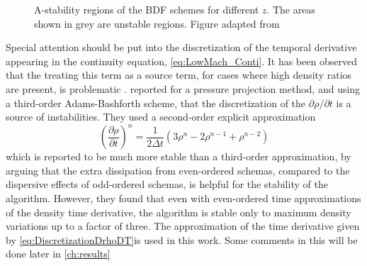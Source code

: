 \begin{figure}
	\centering
	\pgfplotsset{width=0.5\textwidth}
	
	\caption[{A-stability regions of the BDF schemes for different $z$. The areas shown in grey are unstable regions.} ]{A-stability regions of the BDF schemes for different $z$. The areas shown in grey are unstable regions. Figure adapted from \parencite{kikkerHighOrderEXtendedDiscontinuous2020}} 
	\label{Fig:AStability}
\end{figure}







Special attention should be put into the discretization of the temporal derivative appearing in the continuity equation, \cref{eq:LowMach_Conti}. It has been observed that the treating this term as a source term, for cases where high density ratios are present, is problematic \parencite{cookDirectNumericalSimulation1996,nicoudConservativeHighOrderFiniteDifference2000}. \textcite{cookDirectNumericalSimulation1996} reported for a pressure projection method, and using a third-order Adams-Bashforth scheme, that the discretization of the $\partial \rho /\partial t$ is a source of instabilities. They used a second-order explicit approximation
\begin{equation}
	\left(\frac{\partial \rho}{\partial t} \right)^n= \frac{1}{2\Delta t}\left(3\rho^n-2\rho^{n-1}+\rho^{n-2}\right) \label{eq:DiscretizationDrhoDT}
\end{equation}
which is reported to be much more stable than a third-order approximation, by arguing that the extra dissipation from even-ordered schemas, compared to the dispersive effects of odd-ordered schemas, is helpful for the stability of the algorithm. However, they found that even with even-ordered time approximations of the density time derivative, the algorithm is stable only to maximum density variations up to a factor of three. The approximation of the time derivative given by \cref{eq:DiscretizationDrhoDT}is used in this work. Some comments in this will be done later in \cref{ch:results}

